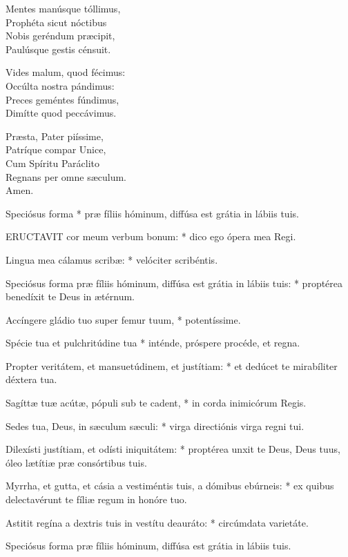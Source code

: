 Mentes manúsque tóllimus,\\
Prophéta sicut nóctibus\\
Nobis geréndum præcipit,\\
Paulúsque gestis cénsuit.

Vides malum, quod fécimus:\\
Occúlta nostra pándimus:\\
Preces geméntes fúndimus,\\
Dimítte quod peccávimus.

Præsta, Pater piíssime,\\
Patríque compar Unice,\\
Cum Spíritu Paráclito\\
Regnans per omne sæculum.\\
Amen.


 Speciósus forma * præ fíliis hóminum, diffúsa est grátia in lábiis tuis.


\lettrine[lines=2]{E}{RUCTAVIT} cor meum verbum bonum: * dico ego ópera mea Regi.

Lingua mea cálamus scribæ: * velóciter scribéntis.

Speciósus forma præ fíliis hóminum, diffúsa est grátia in lábiis tuis: * proptérea benedíxit te Deus in ætérnum.

Accíngere gládio tuo super femur tuum, * potentíssime.

Spécie tua et pulchritúdine tua * inténde, próspere procéde, et regna.

Propter veritátem, et mansuetúdinem, et justítiam: * et dedúcet te mirabíliter déxtera tua.

Sagíttæ tuæ acútæ, pópuli sub te cadent, * in corda inimicórum Regis.

Sedes tua, Deus, in sæculum sæculi: * virga directiónis virga regni tui.

Dilexísti justítiam, et odísti iniquitátem: * proptérea unxit te Deus, Deus tuus, óleo lætítiæ præ consórtibus tuis.

Myrrha, et gutta, et cásia a vestiméntis tuis, a dómibus ebúrneis: * ex quibus delectavérunt te fíliæ regum in honóre tuo.

Astitit regína a dextris tuis in vestítu deauráto: * circúmdata varietáte.

 Speciósus forma præ fíliis hóminum, diffúsa est grátia in lábiis tuis.

